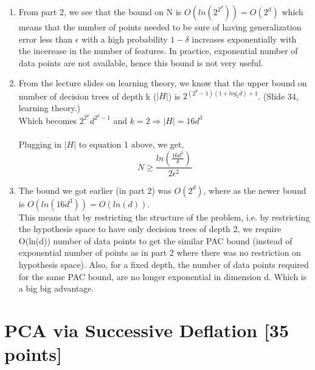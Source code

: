 \documentclass[letterpaper]{article}
\begin{document}
\begin{enumerate}
\item From part 2, we see that the bound on N is $O(ln(2^{2^d})) = O(2^d)$ which means that the number of points needed to be sure of having generalization error less than $\epsilon$ with a high probability $1 - \delta$ increases exponentially with the incerease in the number of features. In practice, exponential number of data points are not available, hence this bound is not very useful.\\
\item From the lecture slides on learning theory, we know that the upper bound on number of decision trees of depth k ($|H|$) is $2^{(2^k -  1)(1+log_2d) +1}$. (Slide 34, learning theory.)\\
Which becomes $2^{2^k}d^{2^k-1}$ and $k=2 \Rightarrow |H| = 16d^3$\\\\
Plugging in $|H|$ to equation 1 above, we get, \\
\begin{equation}
N \geq \frac{ln(\frac{16d^3}{\delta})}{2\epsilon^2}
\end{equation}
\item The bound we got earlier (in part 2) was $O(2^d)$, where as the newer bound is $O(ln(16d^3)) = O(ln(d)).$ \\
This means that by restricting the structure of the problem, i.e. by restricting the hypothesis space to have only decision trees of depth 2, we require O(ln(d)) number of data points to get the similar PAC bound (instead of exponential number of points as in part 2 where there was no restriction on hypothesis space). Also, for a fixed depth, the number of data points required for the same PAC bound, are no longer exponential in dimension d. Which is a big big advantage. 
\end{enumerate}

\section{PCA via Successive Deflation [35 points]}
\end{document}
